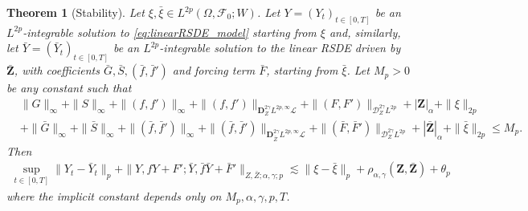 \documentclass[11pt,a4paper]{article}
\newcommand{\E}{\mathbb{E}}
\theoremstyle{plain}
\newtheorem{thm}[defn]{Theorem}
\begin{document}
\begin{thm}[Stability] \label{thm:stabilityforlinearRSDEs}
Let $\xi,\bar{\xi}\in L^{2p}(\Omega,\mathcal{F}_0;W)$. Let $Y=(Y_t)_{t \in [0,T]}$ be an $L^{2p}$-integrable solution to \eqref{eq:linearRSDE_model} starting from $\xi$ and, similarly, let $\bar{Y}=(\bar{Y}_t)_{t \in [0,T]}$ be an $L^{2p}$-integrable solution to the linear RSDE driven by $\bar{\mathbf{Z}}$, with coefficients $\bar{G},\bar{S},(\bar{f},\bar{f}')$ and forcing term $\bar{F}$, starting from $\bar{\xi}$. Let $M_p > 0$ be any constant such that \begin{equation*} \label{eq:constantMinstabilityestimatesforlinearRSDEs}
    \begin{aligned}
     &\|G\|_\infty + \|S\|_\infty + \|(f,f')\|_\infty + \|(f,f')\|_{\mathbf{D}_Z^{2\gamma}L^{2p,\infty}\mathscr{L}} + \|(F,F')\|_{\mathscr{D}^{2\gamma}_ZL^{2p}} + |\mathbf{Z}|_\alpha  + \|\xi\|_{2p}   \\ 
     & +\|\bar{G}\|_\infty + \|\bar{S}\|_\infty +  \|(\bar{f},\bar{f}')\|_\infty + \|(\bar{f},\bar{f}')\|_{\mathbf{D}_{\bar{Z}}^{2\gamma}L^{2p,\infty}\mathscr{L}} + \|(\bar{F},\bar{F}')\|_{\mathscr{D}^{2\gamma}_ZL^{2p}}  + |\bar{\mathbf{Z}}|_\alpha + \|\bar{\xi}\|_{2p} \le M_p.
    \end{aligned}
\end{equation*} 
Then \begin{align*} 
    \sup_{t \in [0,T]} \|Y_t - \bar Y_t\|_p +  \|Y,fY+F';\bar{Y},\bar{f}\bar{Y}+\bar{F}'\|_{Z,\bar{Z};\alpha,\gamma;p} \lesssim \|\xi - \bar{\xi}\|_p + \rho_{\alpha,\gamma}(\mathbf{Z},\bar{\mathbf{Z}}) + \theta_p
\end{align*}
 where the implicit constant depends only on $M_p,\alpha,\gamma,p,T$.
 

\end{thm}
\end{document}
